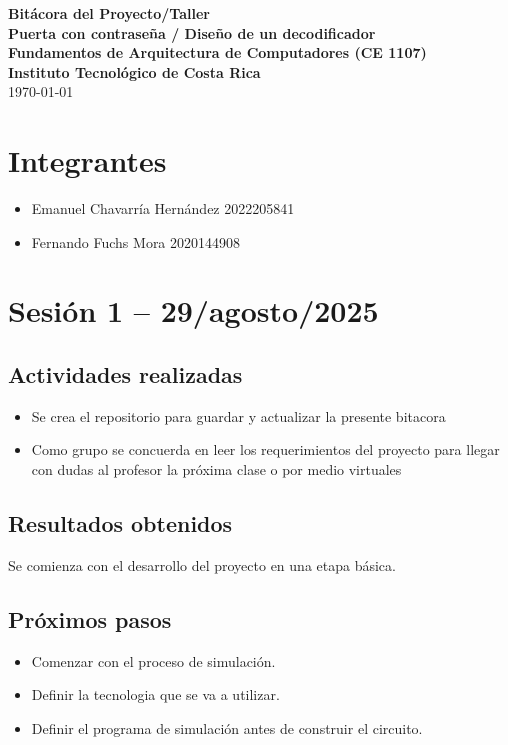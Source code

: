 \documentclass[12pt,letterpaper]{article}
\begin{document}
\begin{center}
    \textbf{\LARGE{Bitácora del Proyecto/Taller}} \\[6mm]
    \textbf{\large{Puerta con contraseña / Diseño de un decodificador}} \\[4mm]
    \textbf{\large{Fundamentos de Arquitectura de Computadores (CE 1107)}} \\[4mm]
    \textbf{\large{Instituto Tecnológico de Costa Rica}} \\[6mm]
    \today
\end{center}

\vspace{1cm}

\section*{Integrantes}
\begin{itemize}[label=\textbullet]
    \item Emanuel Chavarría Hernández 2022205841
    \item Fernando Fuchs Mora 2020144908
\end{itemize}



\section{Sesión 1 -- 29/agosto/2025}
\subsection*{Actividades realizadas}
\begin{itemize}
    \item Se crea el repositorio para guardar y actualizar la presente bitacora
    \item Como grupo se concuerda en leer los requerimientos del proyecto para llegar con dudas al profesor la próxima clase o por medio virtuales
\end{itemize}

\subsection*{Resultados obtenidos}
Se comienza con el desarrollo del proyecto en una etapa básica.


\subsection*{Próximos pasos}
\begin{itemize}
    \item Comenzar con el proceso de simulación.
    \item Definir la tecnologia que se va a utilizar.
    \item Definir el programa de simulación antes de construir el circuito.
\end{itemize}
\end{document}
